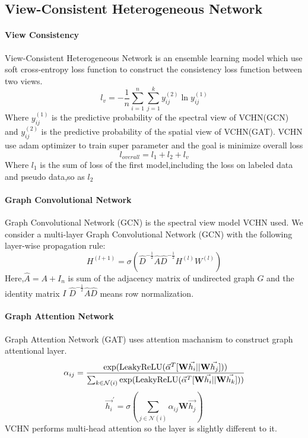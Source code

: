 \documentclass{article}
\begin{document}
\subsection{View-Consistent Heterogeneous Network}
\paragraph{View Consistency}
View-Consistent Heterogeneous Network is an ensemble learning model which use soft cross-entropy loss function
to construct the consistency loss function between two views.
\begin{equation}
l_v=-\frac{1}{n} \sum_{i=1}^n \sum_{j=1}^k y_{ij}^{(2)} \ln y_{ij}^{(1)}
\end{equation}
Where $y_{ij}^{(1)}$ is the predictive probability of the spectral view
of VCHN(GCN) and $y_{ij}^{(2)}$ is the predictive probability of the spatial view
of VCHN(GAT).
VCHN use adam optimizer to train super parameter and the goal is minimize overall loss 
\begin{equation}
l_{overall}=l_1+l_2+l_v
\end{equation}
Where $l_1$ is the sum of loss of the first model,including the loss on labeled data and pseudo data,so as $l_2$
\paragraph{Graph Convolutional Network}
Graph Convolutional Network (GCN) \cite{GCN} is the spectral view model VCHN used.
We consider a multi-layer Graph Convolutional
Network (GCN) with the following layer-wise propagation rule:
\begin{equation}
    H^{(l+1)}=\sigma(\hat{D}^{-\frac{1}{2}}\hat{A}\hat{D}^{-\frac{1}{2}}H^{(l)}W^{(l)})
\end{equation}
Here,$\hat{A}=A+I_n$ is sum of the adjacency matrix of undirected graph $G$ and the identity matrix $I$
$\hat{D}^{-\frac{1}{2}}\hat{A}\hat{D}$ means row normalization.
\paragraph{Graph Attention Network}
Graph Attention Network (GAT) \cite{GAT} uses attention machanism to construct graph attentional layer.
\begin{equation}
    \alpha_{ij}=\frac{\exp ({\rm LeakyReLU} ( \vec{\alpha}^{T} [ \mathbf{W} \vec{h_i}||\mathbf{W}\vec{h_j} ]))}{\sum_{k \in \mathcal{N}(i)}\exp ({\rm LeakyReLU}( \vec{\alpha}^{T} [ \mathbf{W}\vec{h_i}||\mathbf{W} \vec{h_k} ]))}
\end{equation}
\begin{equation}
    \vec{h_i}^{\prime}=\sigma(\sum_{j\in \mathcal{N}(i)} \alpha_{ij} \mathbf{W} \vec{h_j})
\end{equation}
VCHN performs multi-head attention so the layer is slightly different to it.
\end{document}
